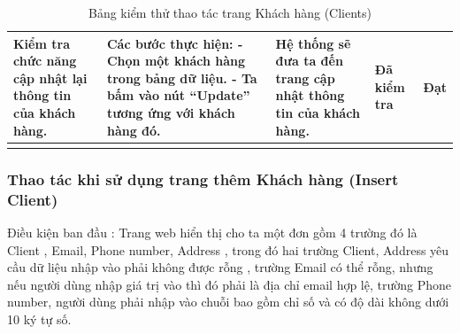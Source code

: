 \documentclass[a4paper]{article}
\begin{document}
\begin{longtable}{ | p{} |p{} | p{}  | p{}  | p{}  | }
\hline
Kiểm tra chức năng cập nhật lại thông tin của khách hàng. &
Các bước thực hiện: \newline
- Chọn một khách hàng trong bảng dữ liệu.  \newline
- Ta bấm vào nút “Update” tương ứng với khách hàng đó. 
&
Hệ thống sẽ đưa ta đến trang cập nhật thông tin của khách hàng. &
Đã kiểm tra &
Đạt \\

\hline
\caption{Bảng kiểm thử thao tác trang Khách hàng (Clients)}
\end{longtable}

\subsubsection*{Thao tác khi sử dụng trang thêm Khách hàng  (Insert Client) }
Điều kiện ban đầu : Trang web hiển thị cho ta một đơn gồm 4 trường đó là Client , Email, Phone number, Address , trong đó hai trường Client, Address yêu cầu dữ liệu nhập vào phải không được rỗng , trường Email có thể rỗng, nhưng nếu người dùng nhập giá trị vào thì đó phải là địa chỉ email hợp lệ, trường Phone number, người dùng phải nhập vào chuỗi bao gồm chỉ số và có độ dài không dưới 10 ký tự số. \newline
\end{document}
